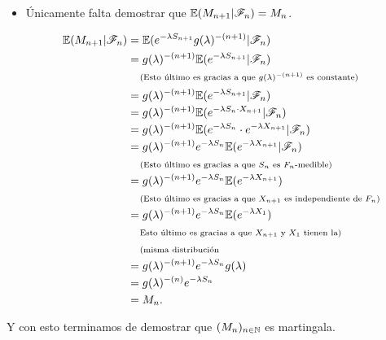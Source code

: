 \begin{itemize}
         \item
            Únicamente falta demostrar que $\mathbb{E}(M_{n+1} | \mathscr{F}_n) = M_n$.\par\null
            
            \begin{align}
                \mathbb{E}(M_{n+1} | \mathscr{F}_n)      &=      \mathbb{E}(e^{-\lambda S_{n+1}}g(\lambda)^{-(n+1)}|\mathscr{F}_n)                                        \\
                                        &=      g(\lambda)^{-(n+1)}\mathbb{E}(e^{-\lambda S_{n+1}}|\mathscr{F}_n)                                        \\
                                        &\;\;\;\;\mbox{{\scriptsize(Esto último es gracias a que $g(\lambda)^{-(n+1)}$ es constante)}}               		\\
                                        &=      g(\lambda)^{-(n+1)}\mathbb{E}(e^{-\lambda S_{n+1}}|\mathscr{F}_n)                                        \\
                                        &=      g(\lambda)^{-(n+1)}\mathbb{E}(e^{-\lambda S_{n} \cdot X_{n+1}}|\mathscr{F}_n)                            \\
                                        &=      g(\lambda)^{-(n+1)}\mathbb{E}(e^{-\lambda S_{n}} \cdot e^{-\lambda X_{n+1}}|\mathscr{F}_n)               \\
                                        &=      g(\lambda)^{-(n+1)} e^{-\lambda S_{n}} \mathbb{E}(e^{-\lambda X_{n+1}}|\mathscr{F}_n)                    \\                                       
                                        &\;\;\;\;\mbox{{\scriptsize(Esto último es gracias a que $S_n$ es $F_n$-medible)}}                           		\\
                                        &=      g(\lambda)^{-(n+1)} e^{-\lambda S_{n}} \mathbb{E}(e^{-\lambda X_{n+1}})                         \\
                                        &\;\;\;\;\mbox{{\scriptsize(Esto último es gracias a que $X_{n+1}$ es independiente de $F_n$)}}              		\\
                                        &=      g(\lambda)^{-(n+1)} e^{-\lambda S_{n}} \mathbb{E}(e^{-\lambda X_{1}})                           \\
                                        &\;\;\;\;\mbox{{\scriptsize Esto último es gracias a que $X_{n+1}$ y $X_1$ tienen la)}}                       	    \\ 
                                        &\;\;\;\;\mbox{{\scriptsize(misma distribución}}   															    \\
                                        &=      g(\lambda)^{-(n+1)} e^{-\lambda S_{n}} g(\lambda)                                       \\
                                        &=      g(\lambda)^{-(n)} e^{-\lambda S_{n}}                                                    \\
                                        &=      M_n.
            \end{align}\par\null
    \end{itemize}
    
    Y con esto terminamos de demostrar que $(M_n)_{n \in \mathbb{N}}$ es martingala.